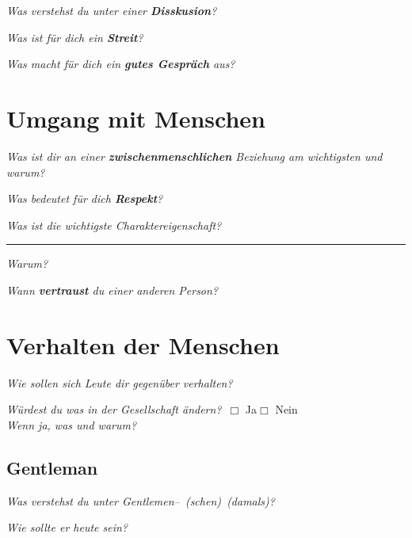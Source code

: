 \documentclass[a4paper,12pt]{scrartcl}
\newcommand{\checkbox}{\(\Box\)}
\newcommand{\hfilloutline}[1]{\rule{#1}{0.5pt}}
\newcommand{\frage}[1]{\textit{#1}}
\renewcommand{\emph}[1]{\textbf{#1}}
\begin{document}
\frage{Was verstehst du unter einer \emph{Disskusion}?}
\vspace{3cm}

\frage{Was ist für dich ein \emph{Streit}?}
\vspace{3cm}

\frage{Was macht für dich ein \emph{gutes Gespräch} aus?}
\vspace{4cm}


\newpage

   



\section*{Umgang mit Menschen}

\frage{Was ist dir an einer \emph{zwischenmenschlichen} Beziehung am wichtigsten und warum?}
\vspace{4cm}


\frage{Was bedeutet für dich \emph{Respekt}?}
\vspace{3cm}


\frage{Was ist die wichtigste Charaktereigenschaft?} \hfill\hfilloutline{7.5cm}
\frage{Warum?}
\vspace{2cm}



\frage{Wann \emph{vertraust} du einer anderen Person?}
\newpage




\section*{Verhalten der Menschen}

\frage{Wie sollen sich Leute dir gegenüber verhalten?}
\vspace{2cm}


\frage{Würdest du was in der Gesellschaft ändern?}\ \checkbox{} Ja\hspace{0.8cm}\checkbox{} Nein\\
\frage{Wenn ja, was und warum?}
\vspace{3cm}

\subsection*{Gentleman}
\frage{Was verstehst du unter Gentlemen--\ (schen)\ (damals)?}
\vspace{2cm} 

\frage{Wie sollte er heute sein?}
\vspace{2cm}
\end{document}
